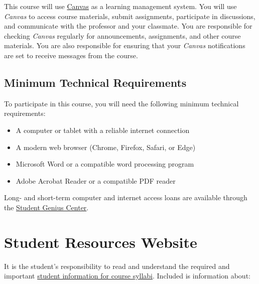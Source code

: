 \documentclass[12pt]{article}     %
\begin{document}
	This course will use \href{https://csufullerton.instructure.com/}{Canvas} as a learning management system. You will use \emph{Canvas} to access course materials, submit assignments, participate in discussions, and communicate with the professor and your classmate. You are responsible for checking \emph{Canvas} regularly for announcements, assignments, and other course materials. You are also responsible for ensuring that your \emph{Canvas} notifications are set to receive messages from the course. 
	
	\subsection*{Minimum Technical Requirements}
	
	To participate in this course, you will need the following minimum technical requirements:
	\begin{itemize}
	    \item A computer or tablet with a reliable internet connection
	    \item A modern web browser (Chrome, Firefox, Safari, or Edge)
	    \item Microsoft Word or a compatible word processing program
	    \item Adobe Acrobat Reader or a compatible PDF reader
	\end{itemize}
	
	
	\noindent Long- and short-term computer and internet access loans are available through the \href{http://www.fullerton.edu/it/students/sgc/index.php}{Student Genius Center}.

\section{Student Resources Website}
It is the student's responsibility to read and understand the required and important \href{https://fdc.fullerton.edu/teaching/student-info-syllabi.html}{student information for course syllabi}. Included is information about:
\end{document}
